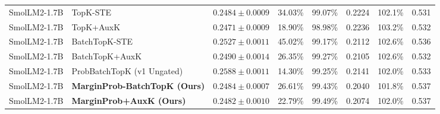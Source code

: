 \documentclass[10pt,twocolumn]{article}
\begin{document}
\begin{table}[t]
{\begin{tabular}{llrrrrrr}
    SmolLM2-1.7B & TopK-STE \citep{gao2024scaling} & $0.2484\pm0.0009$ & 34.03\% & 99.07\% & 0.2224 & 102.1\% & 0.531 \\
    SmolLM2-1.7B & TopK+AuxK \citep{gao2024scaling} & $0.2471\pm0.0009$ & 18.90\% & 98.98\% & 0.2236 & 103.2\% & 0.532 \\
    SmolLM2-1.7B & BatchTopK-STE \citep{bussmann2024batchtopk} & $0.2527\pm0.0011$ & 45.02\% & 99.17\% & 0.2112 & 102.6\% & 0.536 \\
    SmolLM2-1.7B & BatchTopK+AuxK \citep{bussmann2024batchtopk} & $0.2490\pm0.0014$ & 26.35\% & 99.27\% & 0.2105 & 102.6\% & 0.532 \\
    SmolLM2-1.7B & ProbBatchTopK (v1 Ungated) & $0.2588\pm0.0011$ & 14.30\% & 99.25\% & 0.2141 & 102.0\% & 0.533 \\
    SmolLM2-1.7B & \textbf{MarginProb-BatchTopK (Ours)} & $0.2484\pm0.0007$ & 26.61\% & 99.43\% & 0.2040 & 101.8\% & 0.537 \\
    SmolLM2-1.7B & \textbf{MarginProb+AuxK (Ours)} & $0.2482\pm0.0010$ & 22.79\% & 99.49\% & 0.2074 & 102.0\% & 0.537 \\
    \bottomrule
  \end{tabular}}
\end{table}
\end{document}
